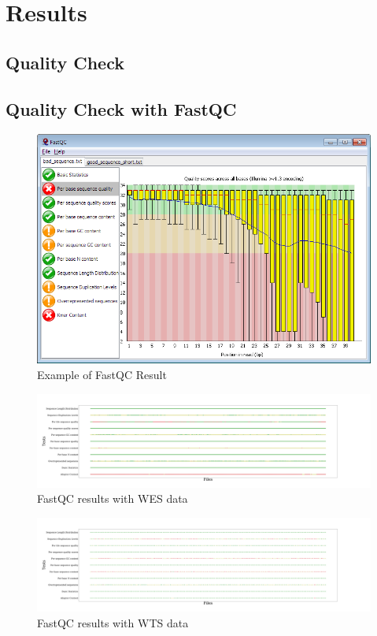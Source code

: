 \documentclass[11pt,a4paper,onecolumn,oneside]{report}
\begin{document}
    \section{Results}
        \subsection{Quality Check}
            \subsection{Quality Check with FastQC}
                \begin{figure}[p]
                    \centering
                    \includegraphics[width=0.6 \linewidth]{figures/Workflow/FastQC.png}
                    \caption{Example of FastQC Result \protect\cite{fastqc1}}
                    \label{fig:FastQC}
                \end{figure}

                \begin{figure}[p]
                    \centering
                    \includegraphics[width=0.8 \linewidth]{figures/FastQC/FastQC_WES.pdf}
                    \caption{FastQC results with WES data}
                    \label{fig:fastqc-WES}
                \end{figure}

                \begin{figure}[p]
                    \centering
                    \includegraphics[width=0.8 \linewidth]{figures/FastQC/FastQC_WTS.pdf}
                    \caption{FastQC results with WTS data}
                    \label{fig:fastqc-WTS}
                \end{figure}
\end{document}

